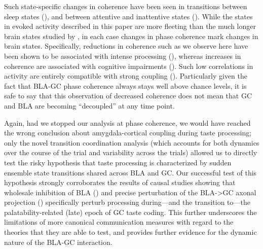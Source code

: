 \begin{refsection}
Such state-specific changes in coherence have been seen in transitions between sleep states (\cite{stitt2017a}), and between attentive and inattentive states (\cite{siegel2008a}). While the states in evoked activity described in this paper are more fleeting than the much longer brain states studied by \cite{stitt2017a,siegel2008a}, in each case changes in phase coherence mark changes in brain states. Specifically, reductions in coherence such as we observe here have been shown to be associated with intense processing (\cite{supp2011a}), whereas increases in coherence are associated with cognitive impairments (\cite{martinet2017a,arbab2018a}). Such low correlations in activity are entirely compatible with strong coupling (\cite{schneidman2006a}). Particularly given the fact that BLA-GC phase coherence always stays well above chance levels, it is safe to say that this observation of decreased coherence does not mean that GC and BLA are becoming “decoupled” at any time point. 

Again, had we stopped our analysis at phase coherence, we would have reached the wrong conclusion about amygdala-cortical coupling during taste processing; only the novel transition coordination analysis (which accounts for both dynamics over the course of the trial and variability across the trials) allowed us to directly test the risky hypothesis that taste processing is characterized by sudden ensemble state transitions shared across BLA and GC. Our successful test of this hypothesis strongly corroborates the results of causal studies showing that wholesale inhibition of BLA (\cite{piette2012a}) and precise perturbation of the BLA->GC axonal projection (\cite{lin2021a}) specifically perturb processing during—and the transition to—the palatability-related (late) epoch of GC taste coding. This further underscores the limitations of more canonical communication measures with regard to the theories that they are able to test, and provides further evidence for the dynamic nature of the BLA-GC interaction.


\end{refsection}
